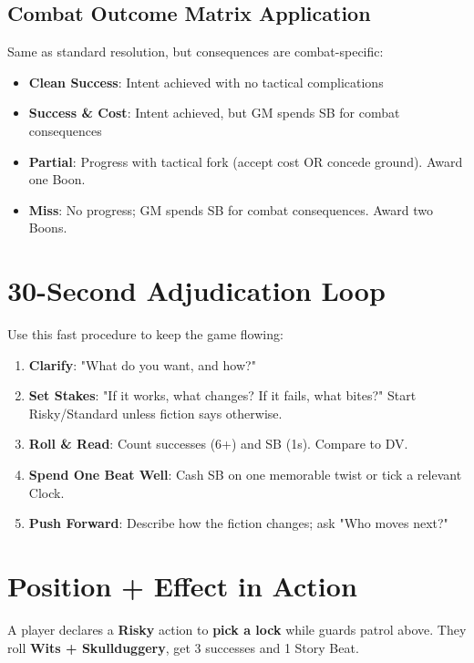 \subsection{Combat Outcome Matrix Application}

Same as standard resolution, but consequences are combat-specific:

\begin{itemize}
    \item \textbf{Clean Success}: Intent achieved with no tactical complications
    \item \textbf{Success \& Cost}: Intent achieved, but GM spends SB for combat consequences
    \item \textbf{Partial}: Progress with tactical fork (accept cost OR concede ground). Award one Boon.
    \item \textbf{Miss}: No progress; GM spends SB for combat consequences. Award two Boons.
\end{itemize}

\section{30-Second Adjudication Loop}

Use this fast procedure to keep the game flowing:

\begin{enumerate}
    \item \textbf{Clarify}: "What do you want, and how?"
    \item \textbf{Set Stakes}: "If it works, what changes? If it fails, what bites?" Start Risky/Standard unless fiction says otherwise.
    \item \textbf{Roll \& Read}: Count successes (6+) and SB (1s). Compare to DV.
    \item \textbf{Spend One Beat Well}: Cash SB on one memorable twist or tick a relevant Clock.
    \item \textbf{Push Forward}: Describe how the fiction changes; ask "Who moves next?"
\end{enumerate}

\section{Position + Effect in Action}

A player declares a \textbf{Risky} action to \textbf{pick a lock} while guards patrol above. They roll \textbf{Wits + Skullduggery}, get 3 successes and 1 Story Beat.

